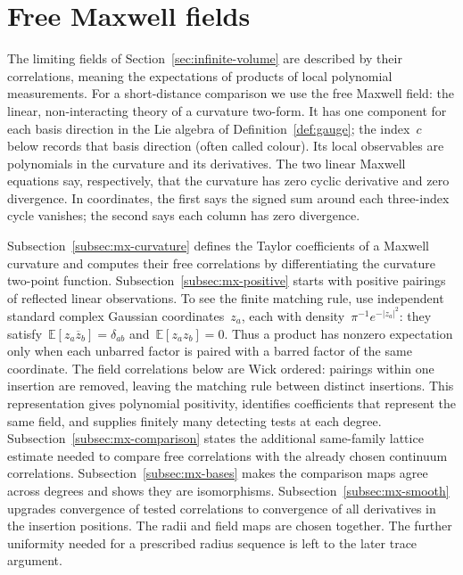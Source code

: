 \section{Free Maxwell fields}\label{sec:maxwell}

The limiting fields of Section~\ref{sec:infinite-volume} are described by their correlations, meaning the expectations of products of local polynomial measurements.
For a short-distance comparison we use the free Maxwell field: the linear, non-interacting theory of a curvature two-form. It has one component for each basis direction in the Lie algebra of Definition~\ref{def:gauge}; the index~$c$ below records that basis direction (often called colour). Its local observables are polynomials in the curvature and its derivatives. The two linear Maxwell equations say, respectively, that the curvature has zero cyclic derivative and zero divergence. In coordinates, the first says the signed sum around each three-index cycle vanishes; the second says each column has zero divergence.

Subsection~\ref{subsec:mx-curvature} defines the Taylor coefficients of a Maxwell curvature and computes their free correlations by differentiating the curvature two-point function.
Subsection~\ref{subsec:mx-positive} starts with positive pairings of reflected linear observations. To see the finite matching rule, use independent standard complex Gaussian coordinates~$z_a$, each with density~$\pi^{-1}e^{-|z_a|^2}$: they satisfy~$\mathbb E[z_a\overline z_b]=\delta_{ab}$ and~$\mathbb E[z_az_b]=0$. Thus a product has nonzero expectation only when each unbarred factor is paired with a barred factor of the same coordinate. The field correlations below are Wick ordered: pairings within one insertion are removed, leaving the matching rule between distinct insertions. This representation gives polynomial positivity, identifies coefficients that represent the same field, and supplies finitely many detecting tests at each degree.
Subsection~\ref{subsec:mx-comparison} states the additional same-family lattice estimate needed to compare free correlations with the already chosen continuum correlations.
Subsection~\ref{subsec:mx-bases} makes the comparison maps agree across degrees and shows they are isomorphisms.
Subsection~\ref{subsec:mx-smooth} upgrades convergence of tested correlations to convergence of all derivatives in the insertion positions.
The radii and field maps are chosen together. The further uniformity needed for a prescribed radius sequence is left to the later trace argument.


